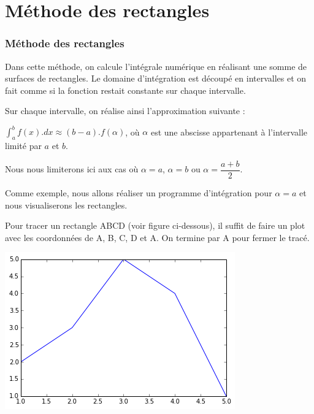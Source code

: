

\section{Méthode des rectangles} 

\begin{frame}[fragile]
\frametitle{Méthode des rectangles}

Dans cette méthode, on calcule l'intégrale numérique en réalisant une somme de surfaces de rectangles. Le domaine d'intégration est découpé en intervalles et on fait comme si la fonction restait constante sur chaque intervalle.

Sur chaque intervalle, on réalise ainsi l'approximation suivante :

$\int_{a}^{b} f(x).dx \approx (b-a).f(\alpha)$, où $\alpha$ est une abscisse appartenant à l'intervalle limité par $a$ et $b$.

Nous nous limiterons ici aux cas où $\alpha=a$, $\alpha=b$ ou $\alpha=\dfrac{a+b}{2}$.

\begin{minipage}{0.6\linewidth}
Comme exemple, nous allons réaliser un programme d'intégration pour $\alpha=a$ et nous visualiserons les rectangles.

Pour tracer un rectangle ABCD (voir figure ci-dessous), il suffit de faire un plot avec les coordonnées de A, B, C, D et A. On termine par A pour fermer le tracé.
\end{minipage}\hfill
\begin{minipage}{0.35\linewidth}
\begin{center}
	\includegraphics[width=0.9\linewidth]{img/courbe0}
\end{center}
\end{minipage}
\end{frame}

